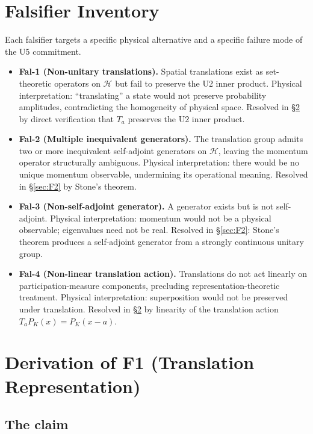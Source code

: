 \documentclass[11pt,a4paper]{article}
\begin{document}
\section{Falsifier Inventory}\label{sec:falsifiers}

Each falsifier targets a specific physical alternative and a specific failure mode of the U5 commitment.

\begin{itemize}
  \item \textbf{Fal-1 (Non-unitary translations).} Spatial translations exist as set-theoretic operators on $\mathcal{H}$ but fail to preserve the U2 inner product. Physical interpretation: ``translating'' a state would not preserve probability amplitudes, contradicting the homogeneity of physical space. Resolved in \S\ref{sec:F1} by direct verification that $T_a$ preserves the U2 inner product.
  \item \textbf{Fal-2 (Multiple inequivalent generators).} The translation group admits two or more inequivalent self-adjoint generators on $\mathcal{H}$, leaving the momentum operator structurally ambiguous. Physical interpretation: there would be no unique momentum observable, undermining its operational meaning. Resolved in \S\ref{sec:F2} by Stone's theorem.
  \item \textbf{Fal-3 (Non-self-adjoint generator).} A generator exists but is not self-adjoint. Physical interpretation: momentum would not be a physical observable; eigenvalues need not be real. Resolved in \S\ref{sec:F2}: Stone's theorem produces a self-adjoint generator from a strongly continuous unitary group.
  \item \textbf{Fal-4 (Non-linear translation action).} Translations do not act linearly on participation-measure components, precluding representation-theoretic treatment. Physical interpretation: superposition would not be preserved under translation. Resolved in \S\ref{sec:F1} by linearity of the translation action $T_a P_K(x) = P_K(x - a)$.
\end{itemize}

\section{Derivation of F1 (Translation Representation)}\label{sec:F1}

\subsection{The claim}
\end{document}
